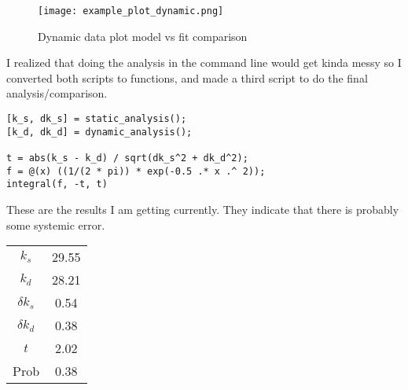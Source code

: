 \documentclass{article}
\begin{document}
    \begin{figure}
        \centering
        \texttt{[image: example\_plot\_dynamic.png]}
        \caption{Dynamic data plot model vs fit comparison}
    \end{figure}
    I realized that doing the analysis in the command line would get kinda messy so I converted both scripts to functions, and made a third script to do the final analysis/comparison.
    \begin{lstlisting}
[k_s, dk_s] = static_analysis();
[k_d, dk_d] = dynamic_analysis();

t = abs(k_s - k_d) / sqrt(dk_s^2 + dk_d^2);
f = @(x) ((1/(2 * pi)) * exp(-0.5 .* x .^ 2));
integral(f, -t, t)
    \end{lstlisting}
    These are the results I am getting currently. They indicate that there is probably some systemic error.\\
    \begin{tabular}{|cc|}
        $k_s$        & 29.55 \\
        $k_d$        & 28.21 \\
        $\delta k_s$ & 0.54  \\
        $\delta k_d$ & 0.38  \\
        $t$          & 2.02  \\
        Prob         & 0.38
    \end{tabular}
\end{document}
